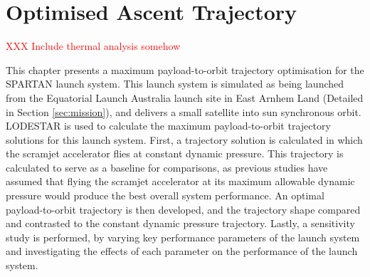 
\cleardoublepage
\chapter{Optimised Ascent Trajectory}\label{chapter:Ascent}
	
	

	
	\textcolor{red}{XXX Include thermal analysis somehow}
	
This chapter presents a maximum payload-to-orbit trajectory optimisation for the SPARTAN launch system. 
This launch system is simulated as being launched from the Equatorial Launch Australia launch site in East Arnhem Land (Detailed in Section \ref{sec:mission}), and delivers a small satellite into sun synchronous orbit. LODESTAR is used to calculate the maximum payload-to-orbit trajectory solutions for this launch system.
First, a trajectory solution is calculated in which the scramjet accelerator flies at constant dynamic pressure. This trajectory is calculated to serve as a baseline for comparisons, as previous studies have assumed that flying the scramjet accelerator at its maximum allowable dynamic pressure would produce the best overall system performance\cite{Preller2017b}. An optimal payload-to-orbit trajectory is then developed, and the trajectory shape compared and contrasted to the constant dynamic pressure trajectory.
Lastly, a sensitivity study is performed, by varying key performance parameters of the launch system and investigating the effects of each parameter on the performance of the launch system. 

